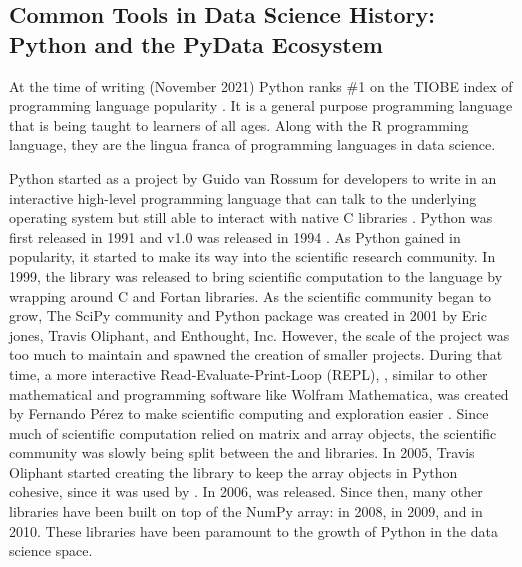 \documentclass[010-intro.tex]{subfiles}
\begin{document}
    \subsection{Common Tools in Data Science History: Python and the PyData Ecosystem}
    
        At the time of writing (November 2021) Python ranks \#1 on the TIOBE index
        of programming language popularity
        \cite{IndexTIOBESoftware}.
        It is a general purpose programming language that is being taught to learners of all ages.
        Along with the R programming language, they are the lingua franca of programming languages in data science.

        Python started as a project by Guido van Rossum for developers
        to write in an interactive high-level programming language that can
        talk to the underlying operating system but still able to interact with native C libraries
        \cite{severanceGuidoVanRossum2005}.
        Python was first released in 1991 and v1.0 was released in 1994
        \cite{severanceGuidoVanRossum2005}.
        As Python gained in popularity,
        it started to make its way into the scientific research community.
        In 1999, the  library was released to bring scientific computation to the language
        by wrapping around C and Fortan libraries.
        As the scientific community began to grow,
        The SciPy community and Python package was created in 2001 by Eric jones, Travis Oliphant, and Enthought, Inc.
        However, the scale of the  project was too much to maintain
        and spawned the creation of smaller  projects.
        During that time,
        a more interactive Read-Evaluate-Print-Loop (REPL),
        ,
        similar to other mathematical and programming software like Wolfram Mathematica,
        was created by Fernando Pérez to make scientific computing and exploration easier
        \cite{iPythondevelopmentteamHistory}.
        Since much of scientific computation relied on matrix and array objects,
        the scientific community was slowly being split between the  and  libraries.
        In 2005, Travis Oliphant started creating the  library to keep the array objects in Python cohesive,
        since it was used by .
        In 2006,  was released.
        Since then, many other libraries have been built on top of the NumPy array:
         in 2008,  in 2009, and  in 2010.
        These libraries have been paramount to the growth of Python in the data science space. %
\end{document}
